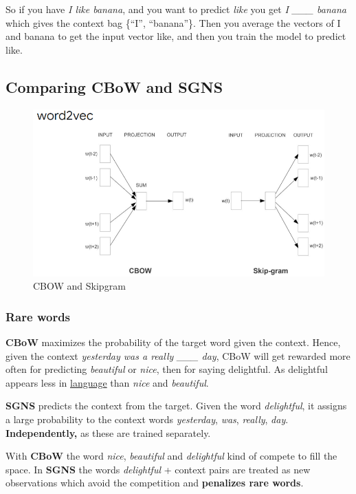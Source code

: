 \documentclass[
  11pt,
  british,
]{article}
\begin{document}
So if you have \emph{I like banana}, and you want to predict \emph{like}
you get \emph{I \_\_\_ banana} which gives the context bag \{``I'',
``banana''\}. Then you average the vectors of I and banana to get the
input vector like, and then you train the model to predict like.

\hypertarget{comparing-cbow-and-sgns}{%
\subsection{Comparing CBoW and SGNS}\label{comparing-cbow-and-sgns}}

\begin{figure}
\centering
\includegraphics{Pasted_image_20220605011501.png}
\caption{CBOW and Skipgram}
\end{figure}

\hypertarget{rare-words}{%
\subsubsection{Rare words}\label{rare-words}}

\textbf{CBoW} maximizes the probability of the target word given the
context. Hence, given the context \emph{yesterday was a really \_\_\_
day}, CBoW will get rewarded more often for predicting \emph{beautiful}
or \emph{nice}, then for saying delightful. As delightful appears less
in \href{../Languages/Languages.md}{language} than \emph{nice} and
\emph{beautiful}.

\textbf{SGNS} predicts the context from the target. Given the word
\emph{delightful}, it assigns a large probability to the context words
\emph{yesterday}, \emph{was}, \emph{really}, \emph{day}.
\textbf{Independently,} as these are trained separately.

With \textbf{CBoW} the word \emph{nice}, \emph{beautiful} and
\emph{delightful} kind of compete to fill the space. In \textbf{SGNS}
the words \emph{delightful} + context pairs are treated as new
observations which avoid the competition and \textbf{penalizes rare
words}.
\end{document}
